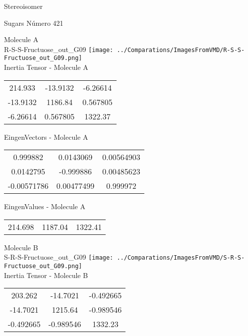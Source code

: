 \begin{center}
\vtab
\vtab
\textcolor{NavyBlue}{\Large Stereoisomer}
\end{center}

 \newpage

\vtab[-2cm]
\begin{center}
{\large Sugars \tab Número 421}
\end{center}
\begin{multicols}{2}
\begin{center}

Molecule A \\ 
R-S-S-Fructuose\_out\_G09
\texttt{[image: ../Comparations/ImagesFromVMD/R-S-S-Fructuose\_out\_G09.png]}
\\
Inertia Tensor - Molecule A \\
\vtab

\begin{tabular}{|c c c|}
214.933	 & 	-13.9132	 & 	-6.26614	 \\
-13.9132	 & 	1186.84	 & 	0.567805	 \\
-6.26614	 & 	0.567805	 & 	1322.37
\end{tabular}

\vtab
 EingenVectors - Molecule A     \\
\vtab
\begin{tabular}{|c c c|}
0.999882	 & 	0.0143069	 & 	0.00564903	 \\
0.0142795	 & 	-0.999886	 & 	0.00485623	 \\
-0.00571786	 & 	0.00477499	 & 	0.999972
\end{tabular}

\vtab
 EingenValues - Molecule A     \\
\vtab
\begin{tabular}{|c c c|}
214.698	 & 	1187.04	 & 	1322.41	 \\
\end{tabular}
\columnbreak

Molecule B \\ 
S-R-S-Fructuose\_out\_G09
\texttt{[image: ../Comparations/ImagesFromVMD/S-R-S-Fructuose\_out\_G09.png]}
\\
Inertia Tensor - Molecule B \\
\vtab

\begin{tabular}{|c c c|}
203.262	 & 	-14.7021	 & 	-0.492665	 \\
-14.7021	 & 	1215.64	 & 	-0.989546	 \\
-0.492665	 & 	-0.989546	 & 	1332.23
\end{tabular}


\end{center}
\end{multicols}
